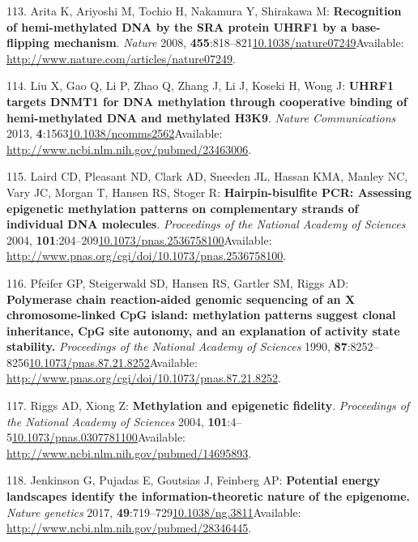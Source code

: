 \documentclass[
]{book}
\begin{document}
\leavevmode\hypertarget{ref-Arita2008}{}%
113. Arita K, Ariyoshi M, Tochio H, Nakamura Y, Shirakawa M: \textbf{Recognition of hemi-methylated DNA by the SRA protein UHRF1 by a base-flipping mechanism}. \emph{Nature} 2008, \textbf{455}:818--821\href{https://doi.org/10.1038/nature07249}{10.1038/nature07249}Available: \url{http://www.nature.com/articles/nature07249}.

\leavevmode\hypertarget{ref-Liu2013b}{}%
114. Liu X, Gao Q, Li P, Zhao Q, Zhang J, Li J, Koseki H, Wong J: \textbf{UHRF1 targets DNMT1 for DNA methylation through cooperative binding of hemi-methylated DNA and methylated H3K9}. \emph{Nature Communications} 2013, \textbf{4}:1563\href{https://doi.org/10.1038/ncomms2562}{10.1038/ncomms2562}Available: \url{http://www.ncbi.nlm.nih.gov/pubmed/23463006}.

\leavevmode\hypertarget{ref-Laird2004}{}%
115. Laird CD, Pleasant ND, Clark AD, Sneeden JL, Hassan KMA, Manley NC, Vary JC, Morgan T, Hansen RS, Stoger R: \textbf{Hairpin-bisulfite PCR: Assessing epigenetic methylation patterns on complementary strands of individual DNA molecules}. \emph{Proceedings of the National Academy of Sciences} 2004, \textbf{101}:204--209\href{https://doi.org/10.1073/pnas.2536758100}{10.1073/pnas.2536758100}Available: \url{http://www.pnas.org/cgi/doi/10.1073/pnas.2536758100}.

\leavevmode\hypertarget{ref-Pfeifer1990a}{}%
116. Pfeifer GP, Steigerwald SD, Hansen RS, Gartler SM, Riggs AD: \textbf{Polymerase chain reaction-aided genomic sequencing of an X chromosome-linked CpG island: methylation patterns suggest clonal inheritance, CpG site autonomy, and an explanation of activity state stability.} \emph{Proceedings of the National Academy of Sciences} 1990, \textbf{87}:8252--8256\href{https://doi.org/10.1073/pnas.87.21.8252}{10.1073/pnas.87.21.8252}Available: \url{http://www.pnas.org/cgi/doi/10.1073/pnas.87.21.8252}.

\leavevmode\hypertarget{ref-Riggs2004a}{}%
117. Riggs AD, Xiong Z: \textbf{Methylation and epigenetic fidelity}. \emph{Proceedings of the National Academy of Sciences} 2004, \textbf{101}:4--5\href{https://doi.org/10.1073/pnas.0307781100}{10.1073/pnas.0307781100}Available: \url{http://www.ncbi.nlm.nih.gov/pubmed/14695893}.

\leavevmode\hypertarget{ref-Jenkinson2017}{}%
118. Jenkinson G, Pujadas E, Goutsias J, Feinberg AP: \textbf{Potential energy landscapes identify the information-theoretic nature of the epigenome.} \emph{Nature genetics} 2017, \textbf{49}:719--729\href{https://doi.org/10.1038/ng.3811}{10.1038/ng.3811}Available: \url{http://www.ncbi.nlm.nih.gov/pubmed/28346445}.
\end{document}
